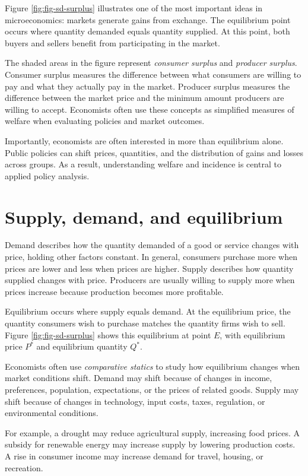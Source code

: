 \documentclass[
  11pt,
  oneside]{book}
\begin{document}
Figure \ref{fig:fig-sd-surplus} illustrates one of the most important ideas in microeconomics: markets generate gains from exchange. The equilibrium point occurs where quantity demanded equals quantity supplied. At this point, both buyers and sellers benefit from participating in the market.

The shaded areas in the figure represent \emph{consumer surplus} and \emph{producer surplus}. Consumer surplus measures the difference between what consumers are willing to pay and what they actually pay in the market. Producer surplus measures the difference between the market price and the minimum amount producers are willing to accept. Economists often use these concepts as simplified measures of welfare when evaluating policies and market outcomes.

Importantly, economists are often interested in more than equilibrium alone. Public policies can shift prices, quantities, and the distribution of gains and losses across groups. As a result, understanding welfare and incidence is central to applied policy analysis.

\section{Supply, demand, and equilibrium}\label{supply-demand-and-equilibrium}

Demand describes how the quantity demanded of a good or service changes with price, holding other factors constant. In general, consumers purchase more when prices are lower and less when prices are higher. Supply describes how quantity supplied changes with price. Producers are usually willing to supply more when prices increase because production becomes more profitable.

Equilibrium occurs where supply equals demand. At the equilibrium price, the quantity consumers wish to purchase matches the quantity firms wish to sell. Figure \ref{fig:fig-sd-surplus} shows this equilibrium at point \(E\), with equilibrium price \(P^*\) and equilibrium quantity \(Q^*\).

Economists often use \emph{comparative statics} to study how equilibrium changes when market conditions shift. Demand may shift because of changes in income, preferences, population, expectations, or the prices of related goods. Supply may shift because of changes in technology, input costs, taxes, regulation, or environmental conditions.

For example, a drought may reduce agricultural supply, increasing food prices. A subsidy for renewable energy may increase supply by lowering production costs. A rise in consumer income may increase demand for travel, housing, or recreation.
\end{document}
